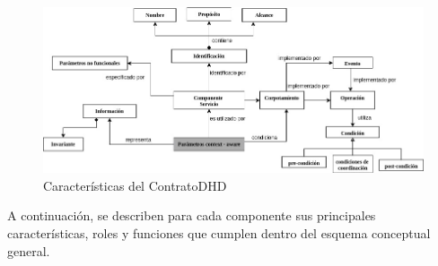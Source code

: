 \begin{figure}
\begin{center}
 \includegraphics [width=6 in,totalheight=3 in]{Ch4/contrato_conceptual}
\end{center}
\caption{Características del ContratoDHD}
\label{fig:contratov2}
\end{figure}

A continuación, se describen para cada componente sus principales características, roles y funciones que cumplen dentro del esquema conceptual general.

